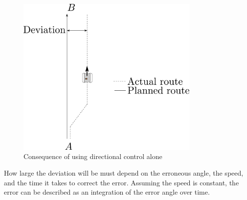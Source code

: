 \begin{figure}[H]
	\centering
	\includegraphics[width=0.8\textwidth]{figures/steeringDeviation.pdf}
	\caption{Consequence of using directional control alone}
	\label{SteeringDeviation}
\end{figure}

How large the deviation will be must depend on the erroneous angle, the speed, and the time it takes to correct the error. Assuming the speed is constant, the error can be described as an integration of the error angle over time.











 
 
 
